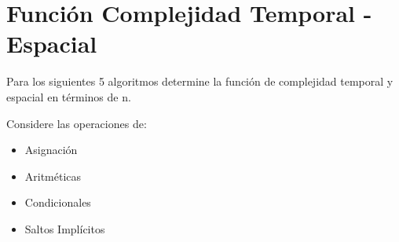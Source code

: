 \documentclass[12pt, fleqn]{article}                            %
\theoremstyle{break}                                            %
\begin{document}
\clearpage
\section{Función Complejidad Temporal - Espacial}


    Para los siguientes 5 algoritmos determine la función de complejidad
    temporal y espacial en términos de n.

    Considere las operaciones de:
    \begin{itemize}
        \item Asignación
        \item Aritméticas
        \item Condicionales
        \item Saltos Implícitos
    \end{itemize}



    \clearpage
\end{document}
